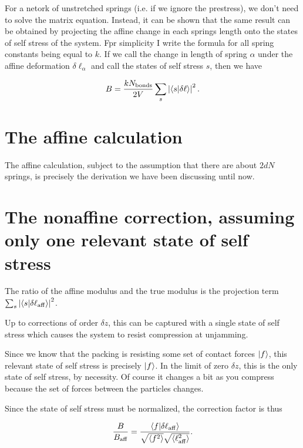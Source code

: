 \documentclass[aps,prl,twocolumn,letter,longbibliography,floatfix]{revtex4-1}
\begin{document}
For a netork of unstretched springs (i.e. if we ignore the prestress), we don't need to solve the matrix equation. Instead, it can be shown that the same result can be obtained by projecting the affine change in each springs length onto the states of self stress of the system.  Fpr simplicity I write the formula for all spring constants being equal to $k$. If we call the change in length of spring $\alpha$  under the affine deformation $\delta \ell_\alpha$ and call the states of self stress $s$, then we have

\begin{equation}
B = \frac{k N_{\mathrm{bonds}}}{2V} \sum_{s} \left| \bra{s}\ket{\delta \ell} \right|^2.
\end{equation}

\section{The affine calculation}

The affine calculation, subject to the assumption that there are about $2dN$ springs, is precisely the derivation we have been discussing until now.

\section{The nonaffine correction, assuming only one relevant state of self stress}

The ratio of the affine modulus and the true modulus is the projection term $\sum_{s} \left| \bra{s}\ket{\delta \ell_\mathrm{aff}} \right|^2$.

Up to corrections of order $\delta z$, this can be captured with a single state of self stress which causes the system to resist compression at unjamming.

Since we know that the packing is resisting some set of contact forces $\ket{f}$, this relevant state of self stress is precisely $\ket{f}$. In the limit of zero $\delta z$, this is the only state of self stress, by necessity. Of course it changes a bit as you compress because the set of forces between the particles changes.

Since the state of self stress must be normalized, the correction factor is thus

\begin{equation}
\frac{B}{B_{\mathrm{aff}}} = \frac{\bra{f}\ket{\delta \ell_{\mathrm{aff}}}}{\sqrt{\langle f^2 \rangle} \sqrt{\langle \ell_{\mathrm{aff}}^2 \rangle}}.
\end{equation}
\end{document}
